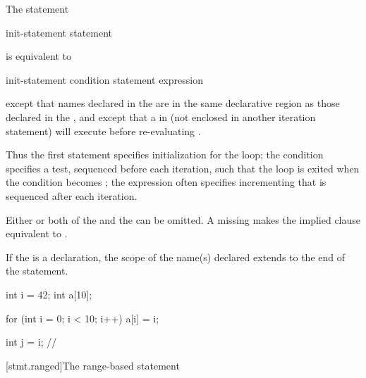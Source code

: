 \pnum
The  statement
\begin{ncsimplebnf}
 \terminal{(} init-statement  \terminal{;}  \terminal{)} statement
\end{ncsimplebnf}
is equivalent to
\begin{ncsimplebnf}
\terminal{\{}\br
\bnfindent init-statement\br
\bnfindent {} \terminal{(} condition \terminal{)} \terminal{\{}\br
\bnfindent\bnfindent statement\br
\bnfindent\bnfindent expression \terminal{;}\br
\bnfindent \terminal{\}}\br
\terminal{\}}
\end{ncsimplebnf}
except that names declared in the  are in
the same declarative region as those declared in the
, and except that a
%
 in  (not enclosed in another
iteration statement) will execute  before
re-evaluating .
\begin{note}
Thus the first statement specifies initialization for the loop; the
condition specifies a test, sequenced before each
iteration, such that the loop is exited when the condition becomes
; the expression often specifies incrementing that is
sequenced after each iteration.
\end{note}

\pnum
Either or both of the 
and the  can be omitted.
A missing 
makes the implied  clause
equivalent to .

\pnum
{}%
%
If the  is a declaration, the scope of the
name(s) declared extends to the end of the  statement.
\begin{example}
\begin{codeblock}
int i = 42;
int a[10];

for (int i = 0; i < 10; i++)
  a[i] = i;

int j = i;          // 
\end{codeblock}
\end{example}

[stmt.ranged]{The range-based  statement}%

